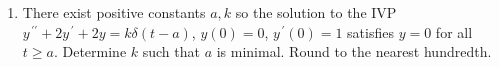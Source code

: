 \documentclass{ximera}
\begin{document}
\begin{enumerate}[label=(\arabic*)]









\item There exist positive constants $a,k$ so the solution to the IVP\\ $y^{\,\prime\prime}+2y^{\,\prime}+2y=k\delta \left(t-a\right)$, $y(0)=0$, $y^{\,\prime}(0)=1$ satisfies $y=0$ for all $t\geq a$.  Determine $k$ such that $a$ is minimal. Round to the nearest hundredth.











\end{enumerate}
\end{document}

